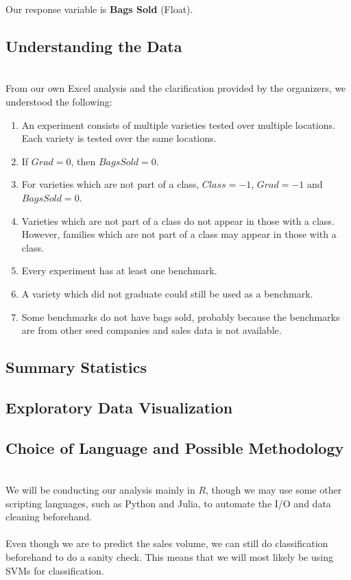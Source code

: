 \documentclass[psamsfonts]{amsart}
\begin{document}
 Our response variable is \textbf{Bags Sold} (Float).\\

\subsection*{Understanding the Data}
\hfill \\

From our own Excel analysis and the clarification provided by the organizers, we understood the following:
\begin{enumerate}
\item An experiment consists of multiple varieties tested over multiple locations. Each variety is tested over the same locations.
\item If $Grad = 0$, then $BagsSold = 0$.
\item For varieties which are not part of a class, $Class = -1$, $Grad = -1$ and $BagsSold = 0$.
\item Varieties which are not part of a class do not appear in those with a class. However, families which are not part of a class may appear in those with a class.
\item Every experiment has at least one benchmark.
\item A variety which did not graduate could still be used as a benchmark.
\item Some benchmarks do not have bags sold, probably because the benchmarks are from other seed companies and sales data is not available.



\end{enumerate}

\subsection*{Summary Statistics}
\subsection*{Exploratory Data Visualization}
\subsection*{Choice of Language and Possible Methodology}
\hfill \\

 
We will be conducting our analysis mainly in $R$, though we may use some other scripting languages, such as Python and Julia, to automate the I/O and data cleaning beforehand.\\
\\
Even though we are to predict the sales volume, we can still do classification beforehand to do a sanity check. This means that we will most likely be using SVMs for classification.
\end{document}
